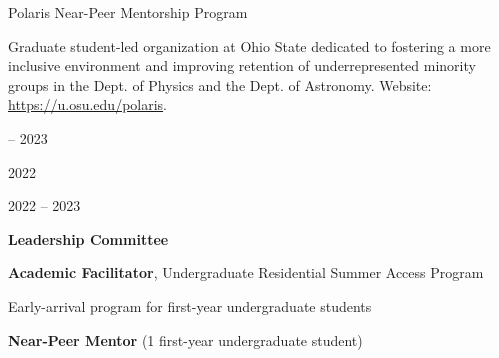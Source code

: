 \documentclass[cv.tex]{subfiles}
\begin{document}
\newpage
\noindent
{\color{themecolor} \large Polaris Near-Peer Mentorship Program}
\par\noindent
Graduate student-led organization at Ohio State dedicated to fostering a more
inclusive environment and improving retention of underrepresented minority
groups in the Dept. of Physics and the Dept. of Astronomy.
Website: \url{https://u.osu.edu/polaris}.
\par\noindent
\parbox{0.18\textwidth}{%
	 -- 2023 \par
	2022 \par
	\null \par
	2022 -- 2023 \par
}
\hspace{1mm}
\parbox{0.8\textwidth}{%
	\textbf{Leadership Committee} \par %
	\textbf{Academic Facilitator}, Undergraduate Residential Summer Access
	Program \par
	Early-arrival program for first-year undergraduate students \par
	\textbf{Near-Peer Mentor} (1 first-year undergraduate student) \par
}
\end{document}
